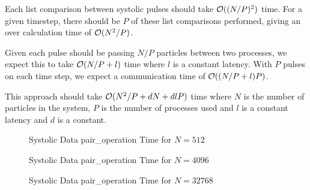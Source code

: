 Each list comparison between systolic pulses should take $\mathcal{O}{((N/P)^2)}$ time.
%
For a given timestep, there should be $P$ of these list comparisons
performed, giving an over calculation time of $\mathcal{O}{(N^2/P)}$.

Given each pulse should be passing $N/P$ particles between two processes,
we expect this to take $\mathcal{O}{(N/P + l)}$ time where $l$ is a constant latency.
%
With $P$ pulses on each time step, we expect a communication time of
$\mathcal{O}{((N/P + l)P)}$.

This approach should take $\mathcal{O}{(N^2/P + dN + dlP)}$ time
where $N$ is the number of particles in the system,
$P$ is the number of processes used and
$l$ is a constant latency and
$d$ is a constant.

\begin{figure}
    
    \caption{Systolic Data pair\_operation Time for $N = 512$}
    \label{fig:v0_systolic_pair_operation_512_logtime}
\end  {figure}

\begin{figure}
    
    \caption{Systolic Data pair\_operation Time for $N = 4096$}
    \label{fig:v0_systolic_pair_operation_4096_logtime}
\end  {figure}

\begin{figure}
    
    \caption{Systolic Data pair\_operation Time for $N = 32768$}
    \label{fig:v0_systolic_pair_operation_32768_logtime}
\end  {figure}
